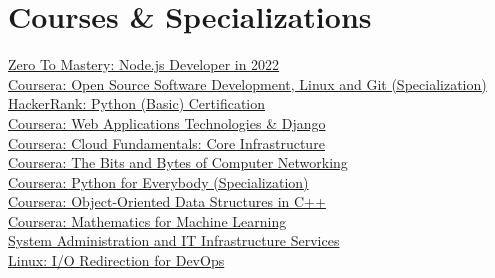 \documentclass[]{deedy-resume-openfont}
\begin{document}
\begin{minipage}[t]{0.66\textwidth}
\section{Courses \& Specializations} 
\href{https://zerotomastery.io/courses/learn-node-js/}{Zero To Mastery: Node.js Developer in 2022} \\
\href{https://www.credly.com/badges/2a0ef498-cbf3-4931-bc37-f617803bc068/public_url}{Coursera: Open Source Software Development, Linux and Git (Specialization)} \\
\href{https://www.hackerrank.com/certificates/4732feca73ea}{HackerRank: Python (Basic) Certification} \\
\href{https://coursera.org/share/e6a976b1c3ca46029dbfedb4117918f7}{Coursera: Web Applications Technologies \& Django} \\
\href{https://coursera.org/share/dee42df7cd902f9bc919a7d724582206}{Coursera: Cloud Fundamentals: Core Infrastructure} \\
\href{https://coursera.org/share/667a58190acd725f3e3cf5268a8bff92}{Coursera: The Bits and Bytes of Computer Networking} \\
\href{https://coursera.org/share/184a7cd6fcbd7ab257da901d8231729f}{Coursera: Python for Everybody (Specialization)}\\
\href{https://coursera.org/share/4c55b7d9965d1a50cc323774f8c017a1}{Coursera: 
Object-Oriented Data Structures in C++} \\
\href{https://coursera.org/share/3869fd6339cdb71091faf4e1ab46387c}{Coursera: Mathematics for Machine Learning} \\
\href{https://coursera.org/share/d121b463290ec9dea363df46b584041d}{System Administration and IT Infrastructure Services} \\
\href{https://coursera.org/share/0f59df6a8fcbb29a9b9544fe8ec256d3}{Linux: I/O Redirection for DevOps} \\
\sectionsep

\end{minipage} 
\end{document}
